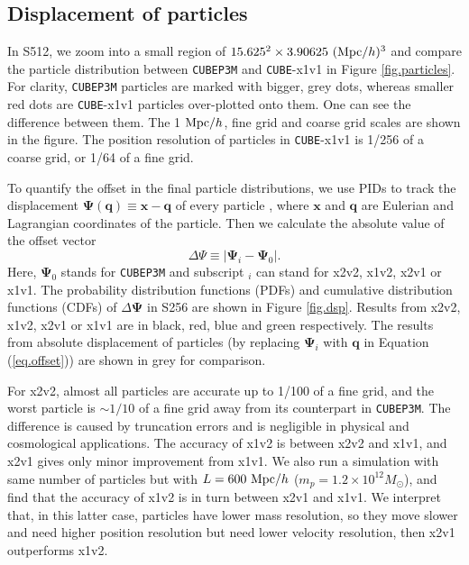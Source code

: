 \documentclass[10pt,twocolumn,preprint]{emulateapj}
\newcommand{\bs}{\boldsymbol}
\newcommand{\Msun}{M_\odot}
\begin{document}
\subsection{Displacement of particles}
In S512, we zoom into a small region of $15.625^2\times 3.90625\ ({\rm Mpc}/h)^3$ and compare the particle distribution between {\tt CUBEP3M} and {\tt CUBE}-x1v1 in Figure \ref{fig.particles}. For clarity, {\tt CUBEP3M} particles are marked with bigger, grey dots, whereas smaller red dots are {\tt CUBE}-x1v1 particles over-plotted onto them. One can see the difference between them. The 1 ${\rm Mpc}/h$, fine grid and coarse grid scales are shown in the figure. The position resolution of particles in {\tt CUBE}-x1v1 is 1/256 of a coarse grid, or 1/64 of a fine grid.

To quantify the offset in the final particle distributions, we use PIDs to track the displacement ${\bs \Psi}({\bs q})\equiv{\bs x}-{\bs q}$ of every particle \citep{2017PhRvD..95d3501Y}, where ${\bs x}$ and ${\bs q}$ are Eulerian and Lagrangian coordinates of the particle. Then we calculate the absolute value of the offset vector
\begin{equation}\label{eq.offset}
	\Delta\Psi\equiv|{\bs\Psi}_i-{\bs\Psi}_0|.
\end{equation}
Here, ${\bs\Psi}_0$ stands for {\tt CUBEP3M} and subscript $_i$ can stand for x2v2, x1v2, x2v1 or x1v1. The probability distribution functions (PDFs) and cumulative distribution functions (CDFs) of $\Delta\bs\Psi$ in S256 are shown in Figure \ref{fig.dsp}. Results from x2v2, x1v2, x2v1 or x1v1 are in black, red, blue and green respectively. The results from absolute displacement of particles (by replacing ${\bs\Psi}_i$ with ${\bs q}$ in Equation (\ref{eq.offset})) are shown in grey for comparison.

For x2v2, almost all particles are accurate up to 1/100 of a fine grid, and the worst particle is $\sim 1/10$ of a fine grid away from its counterpart in {\tt CUBEP3M}. The difference is caused by truncation errors and is negligible in physical and cosmological applications. The accuracy of x1v2 is between x2v2 and x1v1, and x2v1 gives only minor improvement from x1v1. We also run a simulation with same number of particles but with $L=600\ {\rm Mpc}/h$ ($m_p=1.2\times 10^{12}\Msun$), and find that the accuracy of x1v2 is in turn between x2v1 and x1v1. We interpret that, in this latter case, particles have lower mass resolution, so they move slower and need higher position resolution but need lower velocity resolution, then x2v1 outperforms x1v2.
\end{document}
